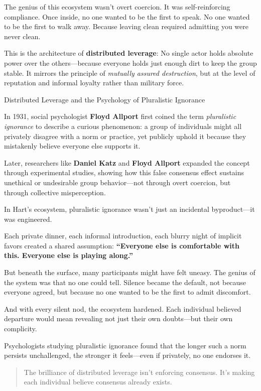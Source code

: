 The genius of this ecosystem wasn’t overt coercion. It was self-reinforcing compliance. Once inside, no one wanted to be the first to speak. No one wanted to be the first to walk away. Because leaving clean required admitting you were never clean.

This is the architecture of \textbf{distributed leverage}:  No single actor holds absolute power over the others—because everyone holds just enough dirt to keep the group stable. It mirrors the principle of \emph{mutually assured destruction}, but at the level of reputation and informal loyalty rather than military force.

\medskip

\begin{PsychologySidebar}{Distributed Leverage and the Psychology of Pluralistic Ignorance}

  In 1931, social psychologist \textbf{Floyd Allport} first coined the term \emph{pluralistic ignorance} to describe a curious phenomenon: a group of individuals might all privately disagree with a norm or practice, yet publicly uphold it because they mistakenly believe everyone else supports it.
  \medskip

  Later, researchers like \textbf{Daniel Katz} and \textbf{Floyd Allport} expanded the concept through experimental studies, showing how this false consensus effect sustains unethical or undesirable group behavior—not through overt coercion, but through collective misperception.

  \medskip

  In Hart’s ecosystem, pluralistic ignorance wasn’t just an incidental byproduct—it was engineered.
  \medskip

  Each private dinner, each informal introduction, each blurry night of implicit favors created a shared assumption: \textbf{“Everyone else is comfortable with this. Everyone else is playing along.”}

  \medskip

  But beneath the surface, many participants might have felt uneasy. The genius of the system was that no one could tell. Silence became the default, not because everyone agreed, but because no one wanted to be the first to admit discomfort.

  \medskip

  And with every silent nod, the ecosystem hardened. Each individual believed departure would mean revealing not just their own doubts—but their own complicity.

  \medskip

  Psychologists studying pluralistic ignorance found that the longer such a norm persists unchallenged, the stronger it feels—even if privately, no one endorses it.

  \begin{quote}
  The brilliance of distributed leverage isn’t enforcing consensus.  It’s making each individual believe consensus already exists.
  \end{quote}

\end{PsychologySidebar}

